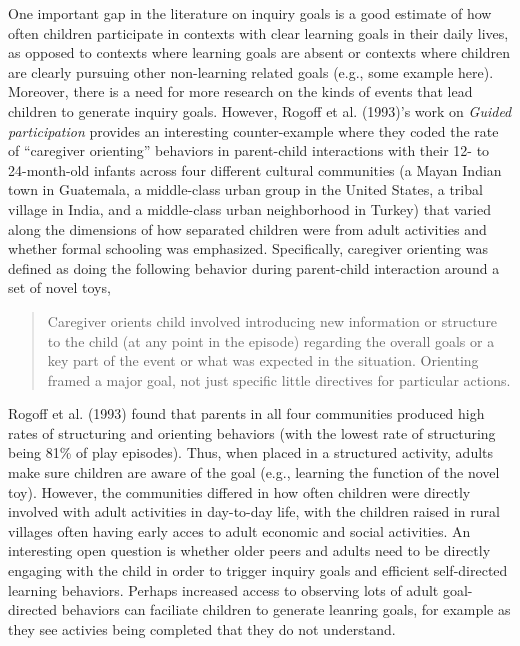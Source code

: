 \documentclass[english,floatsintext,man]{apa6}
\theoremstyle{definition}
\theoremstyle{definition}
\theoremstyle{definition}
\theoremstyle{remark}
\begin{document}
One important gap in the literature on inquiry goals is a good estimate
of how often children participate in contexts with clear learning goals
in their daily lives, as opposed to contexts where learning goals are
absent or contexts where children are clearly pursuing other
non-learning related goals (e.g., some example here). Moreover, there is
a need for more research on the kinds of events that lead children to
generate inquiry goals. However, Rogoff et al. (1993)'s work on
\emph{Guided participation} provides an interesting counter-example
where they coded the rate of \enquote{caregiver orienting} behaviors in
parent-child interactions with their 12- to 24-month-old infants across
four different cultural communities (a Mayan Indian town in Guatemala, a
middle-class urban group in the United States, a tribal village in
India, and a middle-class urban neighborhood in Turkey) that varied
along the dimensions of how separated children were from adult
activities and whether formal schooling was emphasized. Specifically,
caregiver orienting was defined as doing the following behavior during
parent-child interaction around a set of novel toys,

\begin{quote}
Caregiver orients child involved introducing new information or
structure to the child (at any point in the episode) regarding the
overall goals or a key part of the event or what was expected in the
situation. Orienting framed a major goal, not just specific little
directives for particular actions.
\end{quote}

\noindent
Rogoff et al. (1993) found that parents in all four communities produced
high rates of structuring and orienting behaviors (with the lowest rate
of structuring being 81\% of play episodes). Thus, when placed in a
structured activity, adults make sure children are aware of the goal
(e.g., learning the function of the novel toy). However, the communities
differed in how often children were directly involved with adult
activities in day-to-day life, with the children raised in rural
villages often having early acces to adult economic and social
activities. An interesting open question is whether older peers and
adults need to be directly engaging with the child in order to trigger
inquiry goals and efficient self-directed learning behaviors. Perhaps
increased access to observing lots of adult goal-directed behaviors can
faciliate children to generate leanring goals, for example as they see
activies being completed that they do not understand.
\end{document}

